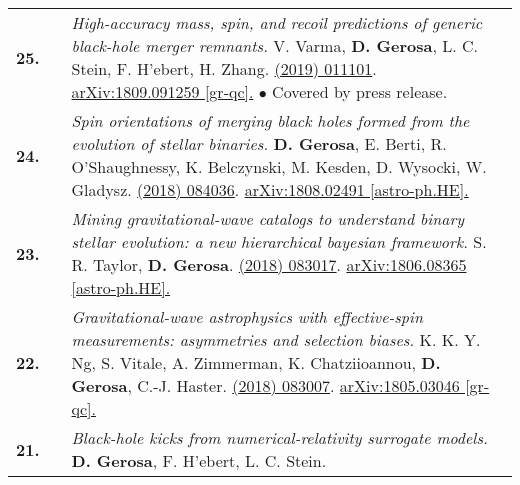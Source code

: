 {\begin{longtable}{rp{0.3cm}p{15.8cm}}
%
\textbf{25.} & & \textit{High-accuracy mass, spin, and recoil predictions of generic black-hole merger remnants.}
\newline{}
V. Varma, \textbf{D. Gerosa}, L. C. Stein, F. H'ebert, H. Zhang.
\newline{}
\href{https://journals.aps.org/prl/abstract/10.1103/PhysRevLett.122.011101}{\prl 122 (2019) 011101}. \href{https://arxiv.org/abs/1809.091259}{arXiv:1809.091259 [gr-qc].}
\newline{}
\textcolor{color1}{$\bullet$} Covered by press release.
\vspace{0.09cm}\\
%
\textbf{24.} & & \textit{Spin orientations of merging black holes formed from the evolution of stellar binaries.}
\newline{}
\textbf{D. Gerosa}, E. Berti, R. O'Shaughnessy, K. Belczynski, M. Kesden, D. Wysocki, W. Gladysz.
\newline{}
\href{https://journals.aps.org/prd/abstract/10.1103/PhysRevD.98.084036}{\prd 98 (2018) 084036}. \href{https://arxiv.org/abs/1808.02491}{arXiv:1808.02491 [astro-ph.HE].}
\vspace{0.09cm}\\
%
\textbf{23.} & & \textit{Mining gravitational-wave catalogs to understand binary stellar evolution: a new hierarchical bayesian framework.}
\newline{}
S. R. Taylor, \textbf{D. Gerosa}.
\newline{}
\href{https://journals.aps.org/prd/abstract/10.1103/PhysRevD.98.083017}{\prd 98 (2018) 083017}. \href{https://arxiv.org/abs/1806.08365}{arXiv:1806.08365 [astro-ph.HE].}
\vspace{0.09cm}\\
%
\textbf{22.} & & \textit{Gravitational-wave astrophysics with effective-spin measurements: asymmetries and selection biases.}
\newline{}
K. K. Y. Ng, S. Vitale, A. Zimmerman, K. Chatziioannou, \textbf{D. Gerosa}, C.-J. Haster.
\newline{}
\href{https://journals.aps.org/prd/abstract/10.1103/PhysRevD.98.083007}{\prd 98 (2018) 083007}. \href{https://arxiv.org/abs/1805.03046}{arXiv:1805.03046 [gr-qc].}
\vspace{0.09cm}\\
%
\textbf{21.} & & \textit{Black-hole kicks from numerical-relativity surrogate models.}
\newline{}
\textbf{D. Gerosa}, F. H'ebert, L. C. Stein.
\newline{}

\end{longtable}}
